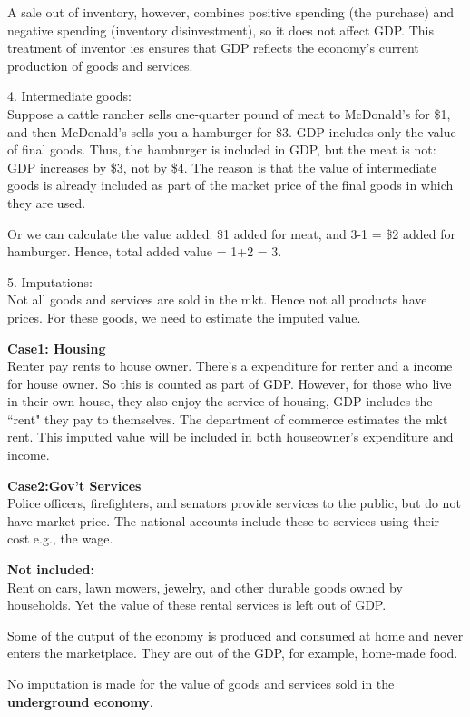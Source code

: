 \documentclass[12pt]{article}
\begin{document}
A sale out of inventory, however, combines positive spending (the purchase) and negative
spending (inventory disinvestment), so it does not affect GDP. This treatment of inventor
ies ensures that GDP reflects the economy’s current production of goods and services.


4. Intermediate goods:\\
Suppose a cattle rancher sells one-quarter pound of meat to McDonald’s for \$1, and 
then McDonald’s sells you a hamburger for \$3. 
GDP includes only the value of final goods. Thus, the hamburger is included in GDP, 
but the meat is not: GDP increases by \$3, not by \$4.
The reason is that the value of intermediate goods is already included as part of the 
market price of the final goods in which they are used.

Or we can calculate the value added. \$1 added for meat, and 3-1 = \$2 added for 
hamburger. Hence, total added value = 1+2 = 3.


5. Imputations:\\
Not all goods and services are sold in the mkt. Hence not all products have prices.
For these goods, we need to estimate the imputed value.

{\textbf {Case1: Housing}}\\
Renter pay rents to house owner. There's a expenditure for renter and a income for 
house owner. So this is counted as part of GDP. However, for those who live in their
own house, they also enjoy the service of housing, GDP includes the ``rent" they
pay to themselves. The department of commerce estimates the mkt rent. This imputed
value will be included in both houseowner's expenditure and income.


{\textbf {Case2:Gov't Services}}\\
Police officers, firefighters, and senators provide services to the public, but do not
have market price. The national accounts include these to services using their cost
e.g., the wage.

{\textbf {Not included:}}\\
Rent on cars, lawn mowers, jewelry, and other durable goods owned by households.
Yet the value of these rental services is left out of GDP.

Some of the output of the economy is produced and consumed at home and never enters the 
marketplace. They are out of the GDP, for example, home-made food.

No imputation is made for the value of goods and services sold in the 
{\textbf {underground economy}}.
\end{document}
